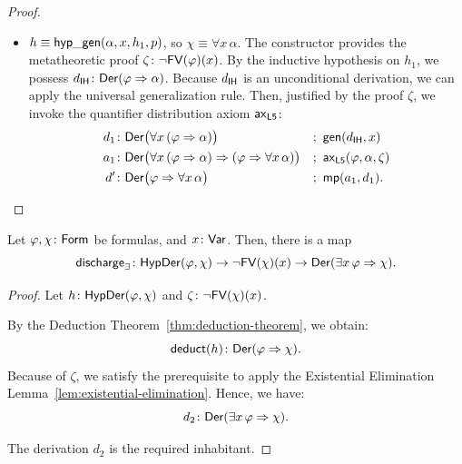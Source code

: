 \begin{proof}
\begin{itemize}
        \item $h\equiv\mathsf{hyp\_gen}(\alpha,x,h_1,p)$, so $\chi\equiv\forall x\,\alpha$. The constructor provides the metatheoretic proof $\zeta\colon\neg\fun{FV}(\varphi)(x)$. By the inductive hypothesis on $h_1$, we possess $d_{\fun{IH}}\colon\fun{Der}(\varphi\imp\alpha)$. Because $d_{\mathsf{IH}}$ is an unconditional derivation, we can apply the universal generalization rule. Then, justified by the proof $\zeta$, we invoke the quantifier distribution axiom $\mathsf{ax}_{\mathsf{L5}}$:
        \begin{align*}
            d_1&\colon\fun{Der}\bigl(
                \forall x\,(\varphi\imp\alpha)
            \bigr)
                &&;\ \fun{gen}(d_{\fun{IH}},x)\\
            a_1&\colon\fun{Der}\bigl(
                \forall x\,
                    (\varphi\imp\alpha)
                    \imp
                    (\varphi\imp\forall x\,\alpha)
            \bigr)
                &&;\ \fun{ax}_{\fun{L5}}(\varphi,\alpha,\zeta)\\
            d'&\colon\fun{Der}\bigl(
                \varphi\imp\forall x\,\alpha
            \bigr)
                &&;\ \fun{mp}(a_1,d_1).
        \end{align*}
    \end{itemize}
\end{proof}

\begin{cor}
    \label{lem:existential-discharge}
    Let $\varphi,\chi\colon\fun{Form}$ be formulas, and $x\colon \fun{Var}$. Then, there is a map
    \[
        \fun{discharge}_\exists\colon
            \fun{HypDer}(\varphi,\chi)
            \to
            \neg\fun{FV}(\chi)(x)
            \to
            \fun{Der}(\exists x\,\varphi\imp\chi).
    \]
\end{cor}

\begin{proof}
    Let $h\colon\fun{HypDer}(\varphi,\chi)$ and $\zeta\colon\neg\fun{FV}(\chi)(x)$.
    
    By the Deduction Theorem~\ref{thm:deduction-theorem}, we obtain:
    \[
        \fun{deduct}(h)\colon\fun{Der}(\varphi\imp\chi).
    \]
    Because of $\zeta$, we satisfy the prerequisite to apply the Existential Elimination Lemma~\ref{lem:existential-elimination}. Hence, we have:
    \[
        d_2\colon\fun{Der}(\exists x\,\varphi\imp\chi).
    \]
    
    The derivation $d_2$ is the required inhabitant.
\end{proof}

